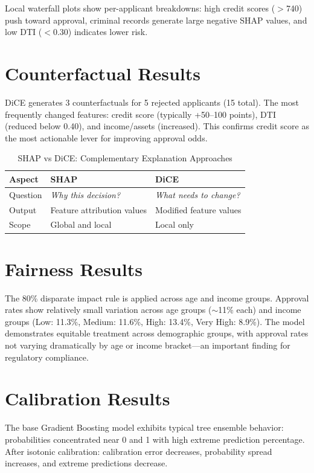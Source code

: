 \documentclass[12pt]{report}
\begin{document}
Local waterfall plots show per-applicant breakdowns: high credit scores ($>$740) push toward approval, criminal records generate large negative SHAP values, and low DTI ($<$0.30) indicates lower risk.


\section{Counterfactual Results}

DiCE generates 3 counterfactuals for 5 rejected applicants (15 total). The most frequently changed features: credit score (typically +50--100 points), DTI (reduced below 0.40), and income/assets (increased). This confirms credit score as the most actionable lever for improving approval odds.

\begin{table}[H]
\centering
\caption{SHAP vs DiCE: Complementary Explanation Approaches}
\label{tab:shap_vs_dice}
\begin{tabular}{lp{4.5cm}p{4.5cm}}
\toprule
\textbf{Aspect} & \textbf{SHAP} & \textbf{DiCE} \\
\midrule
Question & \textit{Why this decision?} & \textit{What needs to change?} \\
Output & Feature attribution values & Modified feature values \\
Scope & Global and local & Local only \\
\bottomrule
\end{tabular}
\end{table}


\section{Fairness Results}

The 80\% disparate impact rule is applied across age and income groups. Approval rates show relatively small variation across age groups ($\sim$11\% each) and income groups (Low: 11.3\%, Medium: 11.6\%, High: 13.4\%, Very High: 8.9\%). The model demonstrates equitable treatment across demographic groups, with approval rates not varying dramatically by age or income bracket---an important finding for regulatory compliance.


\section{Calibration Results}

The base Gradient Boosting model exhibits typical tree ensemble behavior: probabilities concentrated near 0 and 1 with high extreme prediction percentage. After isotonic calibration: calibration error decreases, probability spread increases, and extreme predictions decrease.
\end{document}

